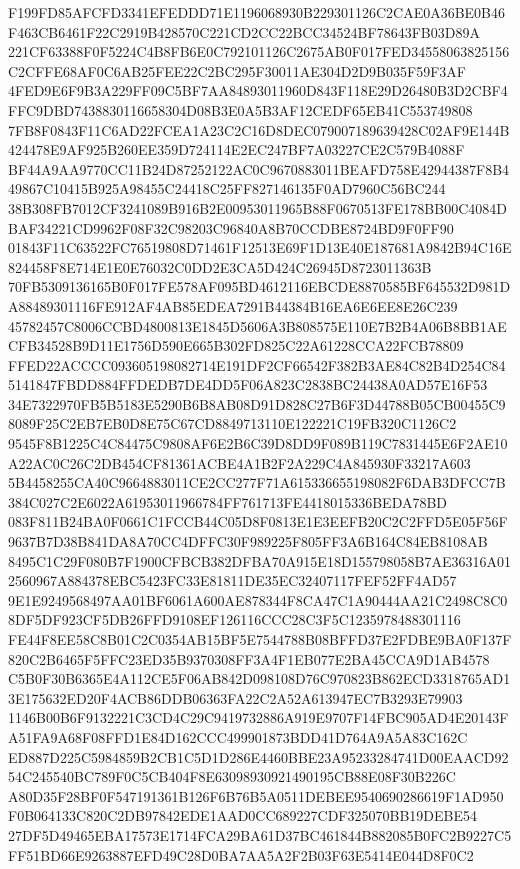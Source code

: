\documentclass[UTF8,fontset=fandol,zihao=-4,a4paper]{ctexart}
\begin{document}
{{F199FD85AFCFD3341EFEDDD71E1196068930B229301126C2CAE0A36BE0B46F463CB6461F22C2919B428570C221CD2CC22BCC34524BF78643FB03D89A
221CF63388F0F5224C4B8FB6E0C792101126C2675AB0F017FED34558063825156C2CFFE68AF0C6AB25FEE22C2BC295F30011AE304D2D9B035F59F3AF
4FED9E6F9B3A229FF09C5BF7AA84893011960D843F118E29D26480B3D2CBF4FFC9DBD7438830116658304D08B3E0A5B3AF12CEDF65EB41C553749808
7FB8F0843F11C6AD22FCEA1A23C2C16D8DEC079007189639428C02AF9E144B424478E9AF925B260EE359D724114E2EC247BF7A03227CE2C579B4088F
BF44A9AA9770CC11B24D87252122AC0C9670883011BEAFD758E42944387F8B449867C10415B925A98455C24418C25FF827146135F0AD7960C56BC244
38B308FB7012CF3241089B916B2E00953011965B88F0670513FE178BB00C4084DBAF34221CD9962F08F32C98203C96840A8B70CCDBE8724BD9F0FF90
01843F11C63522FC76519808D71461F12513E69F1D13E40E187681A9842B94C16E824458F8E714E1E0E76032C0DD2E3CA5D424C26945D8723011363B
70FB5309136165B0F017FE578AF095BD4612116EBCDE8870585BF645532D981DA88489301116FE912AF4AB85EDEA7291B44384B16EA6E6EE8E26C239
45782457C8006CCBD4800813E1845D5606A3B808575E110E7B2B4A06B8BB1AECFB34528B9D11E1756D590E665B302FD825C22A61228CCA22FCB78809
FFED22ACCCC093605198082714E191DF2CF66542F382B3AE84C82B4D254C845141847FBDD884FFDEDB7DE4DD5F06A823C2838BC24438A0AD57E16F53
34E7322970FB5B5183E5290B6B8AB08D91D828C27B6F3D44788B05CB00455C98089F25C2EB7EB0D8E75C67CD8849713110E122221C19FB320C1126C2
9545F8B1225C4C84475C9808AF6E2B6C39D8DD9F089B119C7831445E6F2AE10A22AC0C26C2DB454CF81361ACBE4A1B2F2A229C4A845930F33217A603
5B4458255CA40C9664883011CE2CC277F71A615336655198082F6DAB3DFCC7B384C027C2E6022A61953011966784FF761713FE4418015336BEDA78BD
083F811B24BA0F0661C1FCCB44C05D8F0813E1E3EEFB20C2C2FFD5E05F56F9637B7D38B841DA8A70CC4DFFC30F989225F805FF3A6B164C84EB8108AB
8495C1C29F080B7F1900CFBCB382DFBA70A915E18D155798058B7AE36316A012560967A884378EBC5423FC33E81811DE35EC32407117FEF52FF4AD57
9E1E9249568497AA01BF6061A600AE878344F8CA47C1A90444AA21C2498C8C08DF5DF923CF5DB26FFD9108EF126116CCC28C3F5C1235978488301116
FE44F8EE58C8B01C2C0354AB15BF5E7544788B08BFFD37E2FDBE9BA0F137F820C2B6465F5FFC23ED35B9370308FF3A4F1EB077E2BA45CCA9D1AB4578
C5B0F30B6365E4A112CE5F06AB842D098108D76C970823B862ECD3318765AD13E175632ED20F4ACB86DDB06363FA22C2A52A613947EC7B3293E79903
1146B00B6F9132221C3CD4C29C9419732886A919E9707F14FBC905AD4E20143FA51FA9A68F08FFD1E84D162CCC499901873BDD41D764A9A5A83C162C
ED887D225C5984859B2CB1C5D1D286E4460BBE23A95233284741D00EAACD9254C245540BC789F0C5CB404F8E63098930921490195CB88E08F30B226C
A80D35F28BF0F547191361B126F6B76B5A0511DEBEE9540690286619F1AD950F0B064133C820C2DB97842EDE1AAD0CC689227CDF325070BB19DEBE54
27DF5D49465EBA17573E1714FCA29BA61D37BC461844B882085B0FC2B9227C5FF51BD66E9263887EFD49C28D0BA7AA5A2F2B03F63E5414E044D8F0C2
}}
\end{document}
